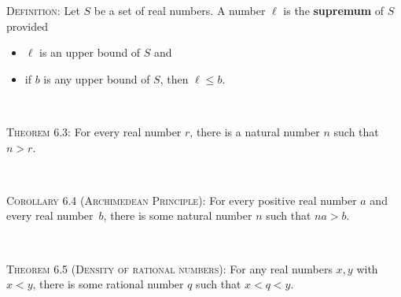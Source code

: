 \documentclass[12pt]{amsart}
\numberwithin{equation}{section}
\theoremstyle{plain} %
\theoremstyle{definition}
\theoremstyle{remark}
\begin{document}
\begin{framed}
\noindent \textsc{Definition:} Let $S$ be a set of real numbers. A number $\ell$ is the \textbf{supremum} of $S$ provided
\begin{itemize}
\item $\ell$ is an upper bound of $S$ and 
\item if $b$ is any upper bound of $S$, then $\ell \leq b$.
\end{itemize}

\

\noindent \textsc{Theorem 6.3:} For every real number $r$, there is a natural number $n$ such that $n>r$.

\

\noindent \textsc{Corollary 6.4 (Archimedean Principle):} For every positive real number $a$ and every real number~$b$, there is some natural number $n$ such that $na>b$.

\

\noindent \textsc{Theorem 6.5 (Density of rational numbers):} For any real numbers $x,y$ with $x<y$, there is some rational number $q$ such that $x<q<y$.

\

\end{framed}

\
\end{document}
